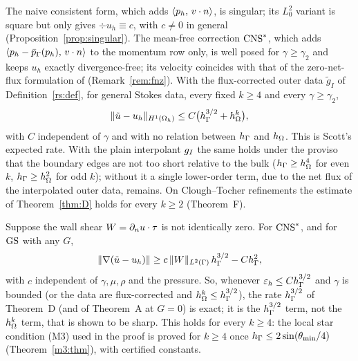 \begin{theoremD}
The naive consistent form, which adds $\langle p_h,\, v\cdot n\rangle$, is singular; its $L^2_0$ variant is square but only gives $\div u_h\equiv c$, with $c\ne0$ in general (Proposition~\ref{prop:singular}). The mean-free correction $\mathrm{CNS}^\ast$, which adds $\langle p_h-\bar p_{\Gamma}(p_h),\, v\cdot n\rangle$ to the momentum row only, is well posed for $\gamma\ge\gamma_2$ and keeps $u_h$ exactly divergence-free; its velocity coincides with that of the zero-net-flux formulation of \cite{FrachonNilssonZahedi2024} (Remark~\ref{rem:fnz}). With the flux-corrected outer data $\tilde g_I$ of Definition~\ref{rs:def}, for general Stokes data, every fixed $k\ge4$ and every $\gamma\ge\gamma_2$,
\[
\lVert \tilde u-u_h\rVert_{H^1(\Omega_h)}\le C\bigl(h_\Gamma^{3/2}+h_\Omega^{k}\bigr),
\]
with $C$ independent of $\gamma$ and with no relation between $h_\Gamma$ and $h_\Omega$. This is Scott's expected rate. With the plain interpolant $g_I$ the same holds under the proviso that the boundary edges are not too short relative to the bulk ($h_\Gamma\ge h_\Omega^4$ for even $k$, $h_\Gamma\ge h_\Omega^2$ for odd $k$); without it a single lower-order term, due to the net flux of the interpolated outer data, remains. On Clough--Tocher refinements the estimate of Theorem~\ref{thm:D} holds for every $k\ge2$ (Theorem~F).
\end{theoremD}

\begin{theoremDp}
Suppose the wall shear $W=\partial_n u\cdot\tau$ is not identically zero. For $\mathrm{CNS}^\ast$, and for $\mathrm{GS}$ with any $G$,
\[
\lVert \nabla(\tilde u-u_h)\rVert\ge c\,\lVert W\rVert_{L^2(\Gamma)}\,h_\Gamma^{3/2}-Ch_\Gamma^2 ,
\]
with $c$ independent of $\gamma,\mu,\rho$ and the pressure. So, whenever $\varepsilon_h\le Ch_\Gamma^{3/2}$ and $\gamma$ is bounded (or the data are flux-corrected and $h_\Omega^k\le h_\Gamma^{3/2}$), the rate $h_\Gamma^{3/2}$ of Theorem~D (and of Theorem~A at $G=0$) is exact; it is the $h_\Gamma^{3/2}$ term, not the $h_\Omega^k$ term, that is shown to be sharp. This holds for every $k\ge4$: the local star condition (M3) used in the proof is proved for $k\ge4$ once $h_\Gamma\le2\sin(\theta_{\min}/4)$ (Theorem~\ref{m3:thm}), with certified constants.
\end{theoremDp}

